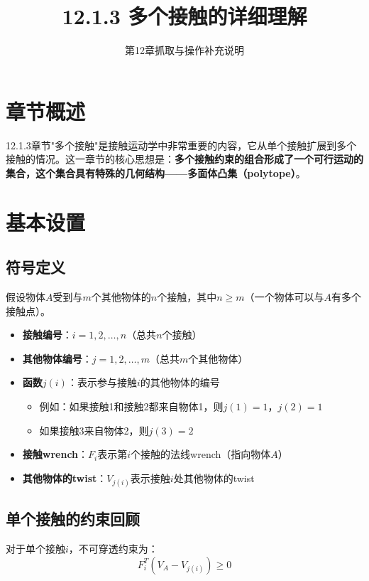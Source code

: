 \documentclass[12pt,a4paper]{article}
\title{12.1.3 多个接触的详细理解}
\author{第12章抓取与操作补充说明}
\date{}
\begin{document}
\maketitle

\section{章节概述}

12.1.3章节"多个接触"是接触运动学中非常重要的内容，它从单个接触扩展到多个接触的情况。这一章节的核心思想是：\textbf{多个接触约束的组合形成了一个可行运动的集合，这个集合具有特殊的几何结构——多面体凸集（polytope）}。

\section{基本设置}

\subsection{符号定义}

假设物体$A$受到与$m$个其他物体的$n$个接触，其中$n \geq m$（一个物体可以与$A$有多个接触点）。

\begin{itemize}
\item \textbf{接触编号}：$i = 1, 2, \ldots, n$（总共$n$个接触）
\item \textbf{其他物体编号}：$j = 1, 2, \ldots, m$（总共$m$个其他物体）
\item \textbf{函数$j(i)$}：表示参与接触$i$的其他物体的编号
  \begin{itemize}
  \item 例如：如果接触1和接触2都来自物体1，则$j(1) = 1$，$j(2) = 1$
  \item 如果接触3来自物体2，则$j(3) = 2$
  \end{itemize}
\item \textbf{接触wrench}：$F_i$表示第$i$个接触的法线wrench（指向物体$A$）
\item \textbf{其他物体的twist}：$V_{j(i)}$表示接触$i$处其他物体的twist
\end{itemize}

\subsection{单个接触的约束回顾}

对于单个接触$i$，不可穿透约束为：
\begin{equation}
F_i^T (V_A - V_{j(i)}) \geq 0
\label{eq:single_contact}
\end{equation}
\end{document}
